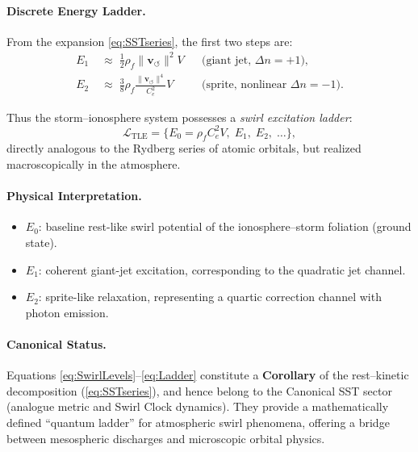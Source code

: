 \documentclass[11pt]{article}
\newcommand{\vnorm}{\lVert \mathbf{v}_{\!\boldsymbol{\circlearrowleft}}\rVert}
\newcommand{\rhof}{\rho_{\!f}}
\newcommand{\Ce}{C_{e}}
\begin{document}
    \paragraph{Discrete Energy Ladder.}
        From the expansion \eqref{eq:SSTseries}, the first two steps are:
        \begin{align}
        E_1 &\;\approx\; \tfrac{1}{2}\rhof \vnorm^2 V
        && \text{(giant jet, $\Delta n = +1$)} ,
        \label{eq:E1}\\
        E_2 &\;\approx\; \tfrac{3}{8}\rhof \frac{\vnorm^4}{\Ce^2} V
        && \text{(sprite, nonlinear $\Delta n = -1$)} .
        \label{eq:E2}
        \end{align}

        Thus the storm--ionosphere system possesses
        a \emph{swirl excitation ladder}:
        \begin{equation}
        \mathcal{L}_{\text{TLE}} =
        \bigl\{ E_0 = \rhof \Ce^2 V, \;
        E_1, \; E_2, \; \dots \bigr\},
        \label{eq:Ladder}
        \end{equation}
        directly analogous to the Rydberg series of atomic orbitals,
        but realized macroscopically in the atmosphere.

    \paragraph{Physical Interpretation.}
        \begin{itemize}
        \item $E_0$: baseline rest-like swirl potential of the
        ionosphere--storm foliation (ground state).
        \item $E_1$: coherent giant-jet excitation,
        corresponding to the quadratic jet channel.
        \item $E_2$: sprite-like relaxation,
        representing a quartic correction channel with photon emission.
        \end{itemize}

    \paragraph{Canonical Status.}
        Equations \eqref{eq:SwirlLevels}--\eqref{eq:Ladder}
        constitute a \textbf{Corollary} of the
        rest--kinetic decomposition (\eqref{eq:SSTseries}),
        and hence belong to the Canonical SST sector
        (analogue metric and Swirl Clock dynamics).
        They provide a mathematically defined ``quantum ladder''
        for atmospheric swirl phenomena, offering a bridge between
        mesospheric discharges and microscopic orbital physics.
\end{document}
